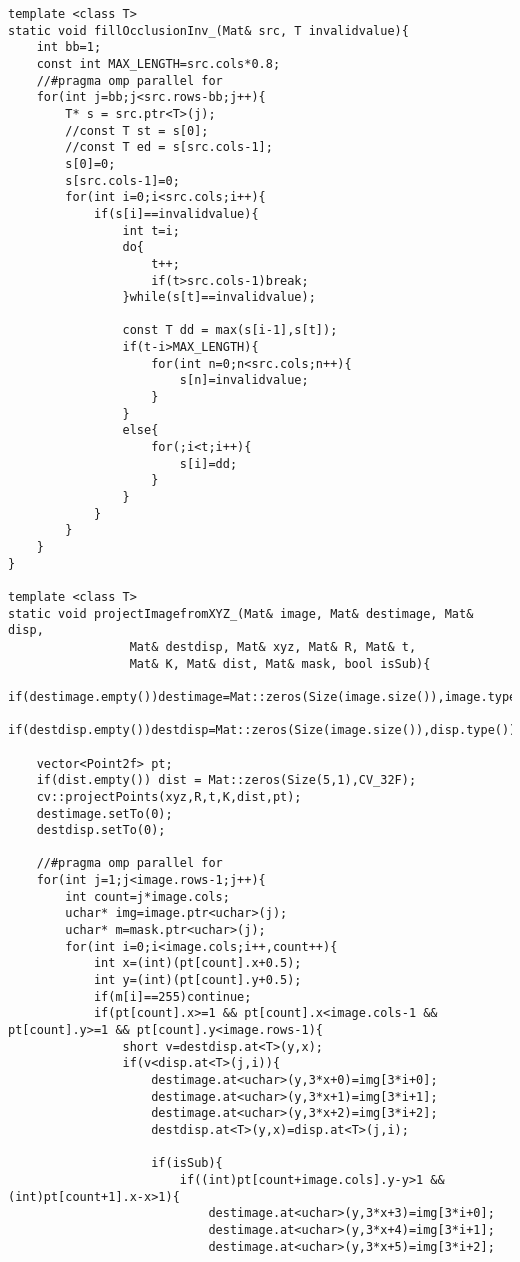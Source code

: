 \begin{lstlisting}[basicstyle=\tiny]
template <class T>
static void fillOcclusionInv_(Mat& src, T invalidvalue){
    int bb=1;
    const int MAX_LENGTH=src.cols*0.8;
    //#pragma omp parallel for
    for(int j=bb;j<src.rows-bb;j++){
        T* s = src.ptr<T>(j);
        //const T st = s[0];
        //const T ed = s[src.cols-1];
        s[0]=0;
        s[src.cols-1]=0;
        for(int i=0;i<src.cols;i++){
            if(s[i]==invalidvalue){
                int t=i;
                do{
                    t++;
                    if(t>src.cols-1)break;
                }while(s[t]==invalidvalue);

                const T dd = max(s[i-1],s[t]);
                if(t-i>MAX_LENGTH){
                    for(int n=0;n<src.cols;n++){
                        s[n]=invalidvalue;
                    }
                }
                else{
                    for(;i<t;i++){
                        s[i]=dd;
                    }
                }
            }
        }
    }
}

template <class T>
static void projectImagefromXYZ_(Mat& image, Mat& destimage, Mat& disp, 
				 Mat& destdisp, Mat& xyz, Mat& R, Mat& t, 
				 Mat& K, Mat& dist, Mat& mask, bool isSub){
    if(destimage.empty())destimage=Mat::zeros(Size(image.size()),image.type());
    if(destdisp.empty())destdisp=Mat::zeros(Size(image.size()),disp.type());

    vector<Point2f> pt;
    if(dist.empty()) dist = Mat::zeros(Size(5,1),CV_32F);
    cv::projectPoints(xyz,R,t,K,dist,pt);
    destimage.setTo(0);
    destdisp.setTo(0);

    //#pragma omp parallel for
    for(int j=1;j<image.rows-1;j++){
        int count=j*image.cols;
        uchar* img=image.ptr<uchar>(j);
        uchar* m=mask.ptr<uchar>(j);
        for(int i=0;i<image.cols;i++,count++){
            int x=(int)(pt[count].x+0.5);
            int y=(int)(pt[count].y+0.5);
            if(m[i]==255)continue;
            if(pt[count].x>=1 && pt[count].x<image.cols-1 && pt[count].y>=1 && pt[count].y<image.rows-1){
                short v=destdisp.at<T>(y,x);
                if(v<disp.at<T>(j,i)){
                    destimage.at<uchar>(y,3*x+0)=img[3*i+0];
                    destimage.at<uchar>(y,3*x+1)=img[3*i+1];
                    destimage.at<uchar>(y,3*x+2)=img[3*i+2];
                    destdisp.at<T>(y,x)=disp.at<T>(j,i);

                    if(isSub){
                        if((int)pt[count+image.cols].y-y>1 && (int)pt[count+1].x-x>1){
                            destimage.at<uchar>(y,3*x+3)=img[3*i+0];
                            destimage.at<uchar>(y,3*x+4)=img[3*i+1];
                            destimage.at<uchar>(y,3*x+5)=img[3*i+2];


\end{lstlisting}
